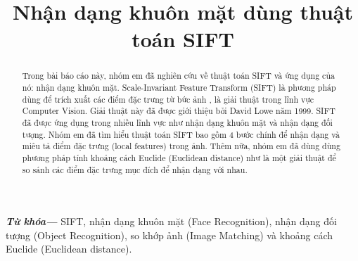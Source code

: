 \documentclass[conference]{IEEEtran}
\begin{document}

\title{Nhận dạng khuôn mặt dùng thuật toán SIFT }

\author{
}
\maketitle


\providecommand{\keywords}[1]{\textbf{\textit{    Từ khóa---}} #1}


\begin{abstract}
Trong bài báo cáo này, nhóm em đã nghiên cứu về thuật toán SIFT và ứng dụng của nó: nhận dạng khuôn mặt. Scale-Invariant Feature Transform (SIFT) là phương pháp dùng để trích xuất các điểm đặc trưng từ bức ảnh \cite{baibao1}, là giải thuật trong lĩnh vực Computer Vision. Giải thuật này đã được giới thiệu bởi David Lowe năm 1999. SIFT đã được ứng dụng trong nhiều lĩnh vực như nhận dạng khuôn mặt và nhận dạng đối tượng. Nhóm em đã tìm hiểu thuật toán SIFT bao gồm 4 bước chính để nhận dạng và miêu tả điểm đặc trưng (local features) trong ảnh. Thêm nữa, nhóm em đã dùng dùng phương pháp tính khoảng cách Euclide (Euclidean distance) như là một giải thuật để so sánh các điểm đặc trưng mục đích để nhận dạng với nhau.
\end{abstract}

\keywords{SIFT, nhận dạng khuôn mặt (Face Recognition), nhận dạng đối tượng (Object Recognition), so khớp ảnh (Image Matching) và khoảng cách Euclide (Euclidean distance).}

\IEEEpeerreviewmaketitle
\end{document}
